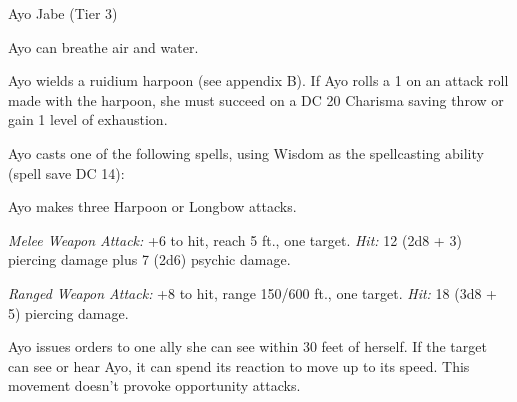 \documentclass[10pt,a4paper,twoside,bg=none,twocolumn,openany,nodeprecatedcode]{dndbook}
\begin{document}
\begin{DndMonster}[float=t]{Ayo Jabe (Tier 3)}
\DndMonsterBasics[
armor-class = {17 (studded leather armor)},
hit-points = {\DndDice{20d8 + 60}},
speed = {30 ft., swim 30 ft.}
]
\DndMonsterAbilityScores[
 str = 16,
 dex = 20,
 con = 16,
 int = 10,
 wis = 16,
 cha = 14
]
\DndMonsterDetails[
saving-throws = {Str +6, Dex +8},
skills = {Athletics +6, Perception +6, Survival +6},
damage-resistances = {acid},
languages = {Common, Goblin, Orc},
challenge = 8,
]
Ayo can breathe air and water.

Ayo wields a ruidium harpoon (see appendix B). If Ayo rolls a 1 on an attack roll made with the harpoon, she must succeed on a DC 20 Charisma saving throw or gain 1 level of exhaustion.

Ayo casts one of the following spells, using Wisdom as the spellcasting ability (spell save DC 14):
\begin{DndMonsterSpells}
\end{DndMonsterSpells}
\par
{}
Ayo makes three Harpoon or Longbow attacks.

\textsl{Melee Weapon Attack:} +6 to hit, reach 5 ft., one target. \textsl{Hit:} 12 (2d8 + 3) piercing damage plus 7 (2d6) psychic damage.

\textsl{Ranged Weapon Attack:} +8 to hit, range 150/600 ft., one target. \textsl{Hit:} 18 (3d8 + 5) piercing damage.

\par
{}
Ayo issues orders to one ally she can see within 30 feet of herself. If the target can see or hear Ayo, it can spend its reaction to move up to its speed. This movement doesn't provoke opportunity attacks.

\end{DndMonster}
\end{document}
